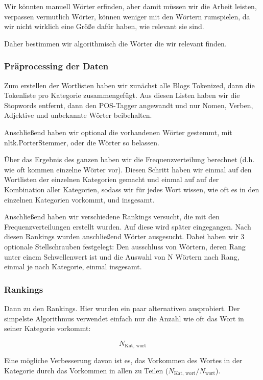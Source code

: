\documentclass[
	11pt,
	a4paper
]{scrartcl}
\begin{document}
Wir könnten manuell Wörter erfinden, aber damit müssen wir die Arbeit leisten, verpassen vermutlich Wörter, 
können weniger mit den Wörtern rumspielen, da wir nicht wirklich eine Größe dafür haben, wie relevant sie sind.

Daher bestimmen wir algorithmisch die Wörter die wir relevant finden.

\subsubsection{Präprocessing der Daten}

Zum erstellen der Wortlisten haben wir zunächst alle Blogs Tokenized, dann die Tokenliste pro Kategorie zusammengefügt. 
Aus diesen Listen haben wir die Stopwords entfernt, dann den POS-Tagger angewandt und nur Nomen, Verben, Adjektive und unbekannte Wörter beibehalten.

Anschließend haben wir optional die vorhandenen Wörter gestemmt, mit nltk.PorterStemmer, oder die Wörter so belassen. 

Über das Ergebnis des ganzen haben wir die Frequenzverteilung berechnet (d.h. wie oft kommen einzelne Wörter vor). 
Diesen Schritt haben wir einmal auf den Wortlisten der einzelnen Kategorien gemacht und einmal auf auf der Kombination aller Kategorien, 
sodass wir für jedes Wort wissen, wie oft es in den einzelnen Kategorien vorkommt, und insgesamt.

Anschließend haben wir verschiedene Rankings versucht, die mit den Frequenzverteilungen erstellt wurden. 
Auf diese wird später eingegangen. Nach diesen Rankings wurden anschließend Wörter ausgesucht. 
Dabei haben wir 3 optionale Stellschrauben festgelegt: Den ausschluss von Wörtern, 
deren Rang unter einem Schwellenwert ist und die Auswahl von N Wörtern nach Rang, einmal je nach Kategorie, einmal insgesamt.

\subsubsection{Rankings}

Dann zu den Rankings. Hier wurden ein paar alternativen ausprobiert. 
Der simpelste Algorithmus verwendet einfach nur die Anzahl wie oft das Wort in seiner Kategorie vorkommt:

\begin{equation}
	N_{\text{Kat, wort}}
\end{equation}

Eine mögliche Verbesserung davon ist es, das Vorkommen des Wortes in der Kategorie durch das Vorkommen in allen zu Teilen ($N_{\text{Kat, wort}} / N_{\text{wort}}$). 
\end{document}
